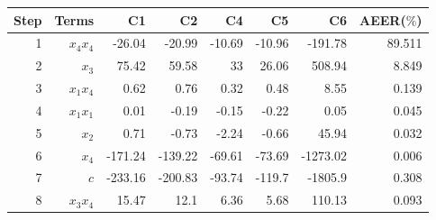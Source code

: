 \begin{tabular}{rrrrrrrr}
Step & Terms & C1 & C2 & C4 & C5 & C6 & AEER($\%$) \\ 
\hline 
1 & $x_4 x_4$ & -26.04 & -20.99 & -10.69 & -10.96 & -191.78 & 89.511 \\ 
2 & $x_3$ & 75.42 & 59.58 & 33 & 26.06 & 508.94  & 8.849 \\ 
3 & $x_1 x_4$ & 0.62 & 0.76 & 0.32 & 0.48 & 8.55 &  0.139 \\ 
4 & $x_1 x_1$ & 0.01 & -0.19 & -0.15 & -0.22 & 0.05 &  0.045 \\ 
5 & $x_2$ & 0.71 & -0.73 & -2.24 & -0.66 & 45.94 &  0.032 \\ 
6 & $x_4$ & -171.24 & -139.22 & -69.61 & -73.69 & -1273.02 & 0.006 \\ 
7 & $c$ & -233.16 & -200.83 & -93.74 & -119.7 & -1805.9 &  0.308 \\ 
8 & $x_3 x_4$ & 15.47 & 12.1 & 6.36 & 5.68 & 110.13 &  0.093 \\ 
\hline 
\end{tabular}
